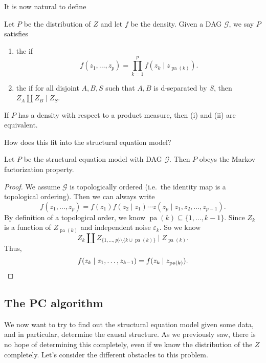 \documentclass[a4paper]{article}
\DeclareMathOperator\pa{pa}
\begin{document}
It is now natural to define
\begin{defi}
  Let $P$ be the distribution of $Z$ and let $f$ be the density. Given a DAG $\mathcal{G}$, we say $P$ satisfies
  \begin{enumerate}
    \item the  if
      \[
        f(z_1, \ldots, z_p) = \prod_{k = 1}^p f(z_k \mid z_{\pa(k)}).
      \]
    \item the  if for all disjoint $A, B, S$ such that $A, B$ is d-separated by $S$, then $Z_A \amalg Z_B \mid Z_S$.
  \end{enumerate}
\end{defi}

\begin{prop}
  If $P$ has a density with respect to a product measure, then (i) and (ii) are equivalent.
\end{prop}

How does this fit into the structural equation model?

\begin{prop}
  Let $P$ be the structural equation model with DAG $\mathcal{G}$. Then $P$ obeys the Markov factorization property.
\end{prop}

\begin{proof}
  We assume $\mathcal{G}$ is topologically ordered (i.e.\ the identity map is a topological ordering). Then we can always write
  \[
    f(z_1, \ldots, z_p) = f(z_1) f(z_2 \mid z_1) \cdots z(z_p \mid z_1, z_2, \ldots, z_{p - 1}).
  \]
  By definition of a topological order, we know $\pa(k) \subseteq \{1, \ldots, k - 1\}$. Since $Z_k$ is a function of $Z_{\pa(k)}$ and independent noise $\varepsilon_k$. So we know
  \[
    Z_{k} \amalg Z_{\{1, \ldots, p\} \setminus \{k \cup \pa(k)\}} \mid Z_{\pa(k)}.
  \]
  Thus,
  \[
    f(z_{k} \mid z_1, \ldots, z_{k - 1}) = f(z_k \mid z_{\pa(k)}).\qedhere
  \]
\end{proof}

\subsection{The PC algorithm}
We now want to try to find out the structural equation model given some data, and in particular, determine the causal structure. As we previously saw, there is no hope of determining this completely, even if we know the distribution of the $Z$ completely. Let's consider the different obstacles to this problem.
\end{document}
